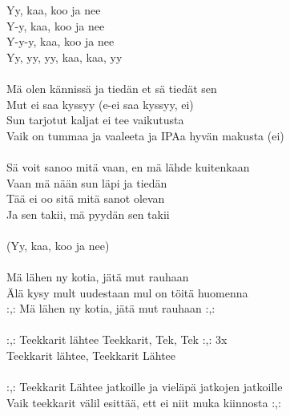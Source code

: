 
            Yy, kaa, koo ja nee \\
            Y-y, kaa, koo ja nee \\
            Y-y-y, kaa, koo ja nee \\
            Yy, yy, yy, kaa, kaa, yy \\
\hspace{10mm} \\
            Mä olen kännissä ja tiedän et sä tiedät sen \\
            Mut ei saa kyssyy (e-ei saa kyssyy, ei) \\
            Sun tarjotut kaljat ei tee vaikutusta \\
            Vaik on tummaa ja vaaleeta ja IPAa hyvän makusta (ei) \\
\hspace{10mm} \\
            Sä voit sanoo mitä vaan, en mä lähde kuitenkaan \\
            Vaan mä nään sun läpi ja tiedän \\
            Tää ei oo sitä mitä sanot olevan \\
            Ja sen takii, mä pyydän sen takii \\
\hspace{10mm} \\
            (Yy, kaa, koo ja nee) \\
\hspace{10mm} \\
            Mä lähen ny kotia, jätä mut rauhaan \\
            Älä kysy mult uudestaan mul on töitä huomenna \\
            :,: Mä lähen ny kotia, jätä mut rauhaan :,: \\
\hspace{10mm} \\
            :,: Teekkarit lähtee Teekkarit, Tek, Tek :,: 3x \\
            Teekkarit lähtee, Teekkarit Lähtee \\
\hspace{10mm} \\
            :,: Teekkarit Lähtee jatkoille ja vieläpä jatkojen jatkoille \\
            Vaik teekkarit välil esittää, ett ei niit muka kiinnosta :,: \\
\hspace{10mm} \\
